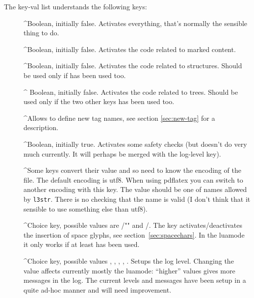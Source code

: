 \documentclass[DIV=12,parskip=half-,bibliography=totoc]{scrartcl}
\begin{document}
\TagP The key-val list understands the following keys:\TagPend
\begin{description}
\item[]
 \TagP^Boolean, initially false. Activates everything, that's normally the sensible thing to do.\Pmeti
\item[]
 \TagP^Boolean, initially false. Activates the code related to marked content.\Pmeti
\item[]
 \TagP^Boolean, initially false. Activates the code related to structures. Should be used only if  has been used too.\Pmeti
\item[]
\TagP^ Boolean, initially false. Activates the code related to trees. Should be used only if the two other keys has been used too.\Pmeti
\item[]
 \TagP^Allows to define new tag names, see section \ref{sec:new-tag} for a description.\Pmeti
\item[]
 \TagP^Boolean, initially true. Activates some safety checks (but doesn't do very much currently. It will perhaps be merged with the log-level key).\Pmeti
\item[]
 \TagP^Some keys convert their value and so need to know the encoding of the file. The default encoding is utf8.  When using pdflatex you can switch to another encoding with this key. The value should be one of names allowed by \texttt{l3str}. There is no checking that the name is valid (I don't think that it sensible to use something else than utf8).\Pmeti
\item[]
 \TagP^Choice key, possible values are /"" and /. The key activates/deactivates the insertion of space glyphs, see section~\ref{sec:spacechars}. In the luamode it only works if at least  has been used.\Pmeti
\item[]
 \TagP^Choice key, possible values , , , ,  .  Setups the log level.  Changing the value affects currently mostly the luamode: \enquote{higher} values gives more messages in the log. The current levels and messages have been setup in a quite ad-hoc manner and will need improvement.\Pmeti
\item[]

\end{description}
\end{document}
